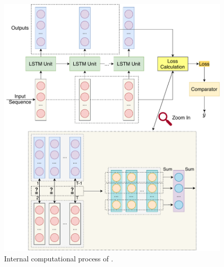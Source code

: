 \begin{figure}[htbp]
	\centering
	\includegraphics[scale=0.45]{figs/interpretability.pdf}
	\caption{Internal computational process of \sys.}
	\label{fig:interpretability}
\end{figure}

